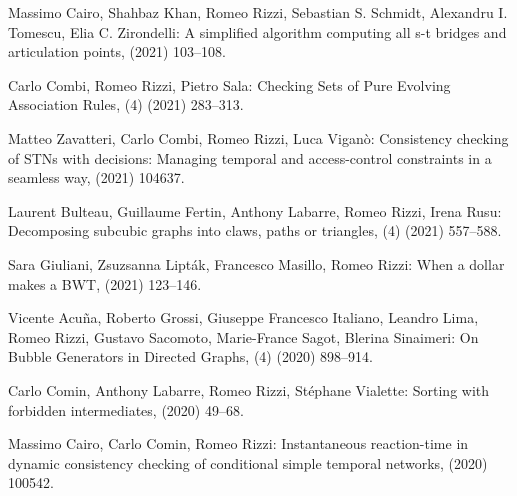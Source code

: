 \begin{etaremune}
  \vspace{-3.0mm}
  
  \item {\sc Massimo Cairo, Shahbaz Khan, Romeo Rizzi, Sebastian S. Schmidt, Alexandru I. Tomescu, Elia C. Zirondelli:}
   \newblock A simplified algorithm computing all s-t bridges and articulation points,
    (2021) 103--108.
   
  \item {\sc Carlo Combi, Romeo Rizzi, Pietro Sala:}
   \newblock Checking Sets of Pure Evolving Association Rules,
   (4) (2021) 283--313.
   
  \item {\sc Matteo Zavatteri, Carlo Combi, Romeo Rizzi, Luca Viganò:}
   \newblock Consistency checking of STNs with decisions: Managing temporal and access-control constraints in a seamless way,
    (2021) 104637.
   
  \item {\sc Laurent Bulteau, Guillaume Fertin, Anthony Labarre, Romeo Rizzi, Irena Rusu:}
   \newblock Decomposing subcubic graphs into claws, paths or triangles,
   (4) (2021) 557--588.
   
  \item {\sc Sara Giuliani, Zsuzsanna Lipták, Francesco Masillo, Romeo Rizzi:}
   \newblock When a dollar makes a BWT,
    (2021) 123--146.
   
  \item {\sc Vicente Acuña, Roberto Grossi, Giuseppe Francesco Italiano, Leandro Lima, Romeo Rizzi, Gustavo Sacomoto, Marie-France Sagot, Blerina Sinaimeri:}
   \newblock On Bubble Generators in Directed Graphs,
   (4) (2020) 898--914.
   
  \item {\sc Carlo Comin, Anthony Labarre, Romeo Rizzi, Stéphane Vialette:}
   \newblock Sorting with forbidden intermediates,
    (2020) 49--68.
   
  \item {\sc Massimo Cairo, Carlo Comin, Romeo Rizzi:}
   \newblock Instantaneous reaction-time in dynamic consistency checking of conditional simple temporal networks,
    (2020) 100542.
   

\end{etaremune}
